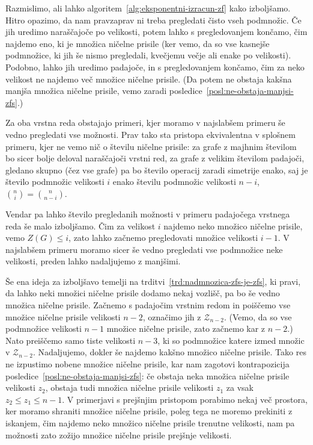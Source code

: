 \documentclass[12pt,a4paper,twoside]{article}
\theoremstyle{definition} %
\theoremstyle{plain} %
\numberwithin{equation}{section}  %
\begin{document}
Razmislimo, ali lahko algoritem~\ref{alg:eksponentni-izracun-zf} kako izboljšamo. Hitro opazimo, da nam pravzaprav ni treba pregledati čisto vseh podmnožic. Če jih uredimo naraščajoče po velikosti, potem lahko s pregledovanjem končamo, čim najdemo eno, ki je množica ničelne prisile (ker vemo, da so vse kasnejše podmnožice, ki jih še nismo pregledali, kvečjemu večje ali enake po velikosti). Podobno, lahko jih uredimo padajoče, in s pregledovanjem končamo, čim za neko velikost ne najdemo več množice ničelne prisile. (Da potem ne obstaja kakšna manjša množica ničelne prisile, vemo zaradi posledice~\ref{posl:ne-obstaja-manjsi-zfs}.)

Za oba vrstna reda obstajajo primeri, kjer moramo v najslabšem primeru še vedno pregledati vse možnosti. Prav tako sta pristopa ekvivalentna v splošnem primeru, kjer ne vemo nič o številu ničelne prisile: za grafe z majhnim številom bo sicer bolje deloval naraščajoči vrstni red, za grafe z velikim številom padajoči, gledano skupno (čez vse grafe) pa bo število operacij zaradi simetrije enako, saj je število podmnožic velikosti $i$ enako številu podmnožic velikosti $n-i$, $\binom{n}{i} = \binom{n}{n-i}$.

Vendar pa lahko število pregledanih možnosti v primeru padajočega vrstnega reda še malo izboljšamo. Čim za velikost $i$ najdemo neko množico ničelne prisile, vemo $Z(G) \leq i$, zato lahko začnemo pregledovati množice velikosti $i-1$. V najslabšem primeru moramo sicer še vedno pregledati vse podmnožice neke velikosti, preden lahko nadaljujemo z manjšimi.

Še ena ideja za izboljšavo temelji na trditvi~\ref{trd:nadmnozica-zfs-je-zfs}, ki pravi, da lahko neki množici ničelne prisile dodamo nekaj vozlišč, pa bo še vedno množica ničelne prisile. Začnemo s padajočim vrstnim redom in poiščemo vse množice ničelne prisile velikosti $n-2$, označimo jih z $\mathcal{Z}_{n-2}$. (Vemo, da so vse podmnožice velikosti $n-1$ množice ničelne prisile, zato začnemo kar z $n-2$.) Nato preiščemo samo tiste velikosti $n-3$, ki so podmnožice katere izmed množic v $\mathcal{Z}_{n-2}$. Nadaljujemo, dokler še najdemo kakšno množico ničelne prisile.
Tako res ne izpustimo nobene množice ničelne prisile, kar nam zagotovi kontrapozicija posledice~\ref{posl:ne-obstaja-manjsi-zfs}: če obstaja neka množica ničelne prisile velikosti $z_2$, obstaja tudi množica ničelne prisile velikosti $z_1$ za vsak $z_2 \leq z_1 \leq n-1$.
V primerjavi s prejšnjim pristopom porabimo nekaj več prostora, ker moramo shraniti množice ničelne prisile, poleg tega ne moremo prekiniti z iskanjem, čim najdemo neko množico ničelne prisile trenutne velikosti, nam pa možnosti zato zožijo množice ničelne prisile prejšnje velikosti.
\end{document}
